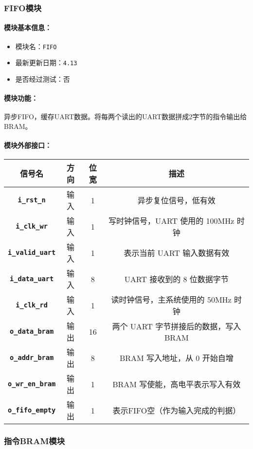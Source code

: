 \documentclass[lang=cn,a4paper,newtx]{elegantpaper}
\begin{document}
\subsubsection{FIFO模块}
\paragraph{模块基本信息：}
\begin{itemize}
  \item 模块名：\texttt{FIFO}
  \item 最新更新日期：\texttt{4.13}
  \item 是否经过测试：否
\end{itemize}
\paragraph{模块功能：}
异步FIFO，缓存UART数据。将每两个读出的UART数据拼成2字节的指令输出给BRAM。
\paragraph{模块外部接口：}
\begin{longtable}{>{\bfseries}c c c c}
  \toprule
  信号名 & 方向 & 位宽 & 描述 \\
  \midrule
  \endhead
  
  \texttt{i\_rst\_n}         & 输入  & 1        & 异步复位信号，低有效 \\
  \texttt{i\_clk\_wr}        & 输入  & 1        & 写时钟信号，UART 使用的 100MHz 时钟 \\
  \texttt{i\_valid\_uart}    & 输入  & 1        & 表示当前 UART 输入数据有效 \\
  \texttt{i\_data\_uart}     & 输入  & 8        & UART 接收到的 8 位数据字节 \\
  \texttt{i\_clk\_rd}        & 输入  & 1        & 读时钟信号，主系统使用的 50MHz 时钟 \\
  \texttt{o\_data\_bram}     & 输出  & 16       & 两个 UART 字节拼接后的数据，写入 BRAM \\
  \texttt{o\_addr\_bram}     & 输出  & 8        & BRAM 写入地址，从 0 开始自增 \\
  \texttt{o\_wr\_en\_bram}   & 输出  & 1        & BRAM 写使能，高电平表示写入有效 \\
  \texttt{o\_fifo\_empty}    & 输出   & 1       & 表示FIFO空（作为输入完成的判据）\\
  \bottomrule
\end{longtable}

\subsubsection{指令BRAM模块}
\end{document}
